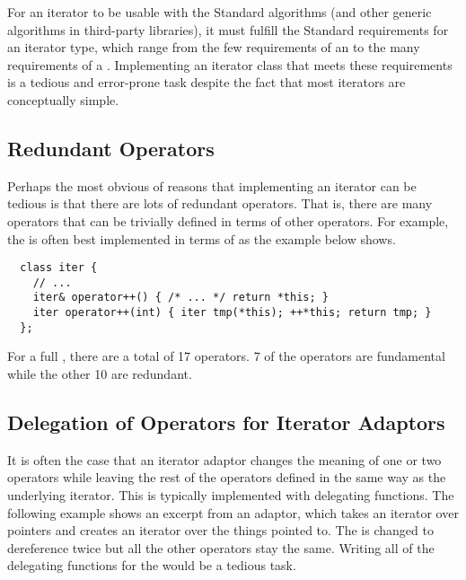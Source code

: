 \documentclass{netobjectdays}
\begin{document}
For an iterator to be usable with the Standard algorithms (and other
generic algorithms in third-party libraries), it must fulfill the
Standard requirements for an iterator type, which range from the few
requirements of an  to the many requirements
of a . Implementing an iterator class
that meets these requirements is a tedious and error-prone task
despite the fact that most iterators are conceptually simple.

\subsection{Redundant Operators}

Perhaps the most obvious of reasons that implementing an iterator can
be tedious is that there are lots of redundant operators.  That is,
there are many operators that can be trivially defined in terms of
other operators. For example, the  is often best
implemented in terms of  as the example below
shows.

{\footnotesize
\begin{verbatim}
  class iter {
    // ...
    iter& operator++() { /* ... */ return *this; }
    iter operator++(int) { iter tmp(*this); ++*this; return tmp; }
  };
\end{verbatim}
}

For a full , there are a total of 17
operators. 7 of the operators are fundamental while the other 10 are
redundant.

 


\subsection{Delegation of Operators for Iterator Adaptors}

It is often the case that an iterator adaptor changes the meaning of
one or two operators while leaving the rest of the operators defined
in the same way as the underlying iterator.  This is typically
implemented with delegating functions. The following example shows an
excerpt from an  adaptor, which takes an
iterator over pointers and creates an iterator over the things pointed
to. The  is changed to dereference twice but all the
other operators stay the same. Writing all of the delegating functions
for the  would be a tedious task.
\end{document}
